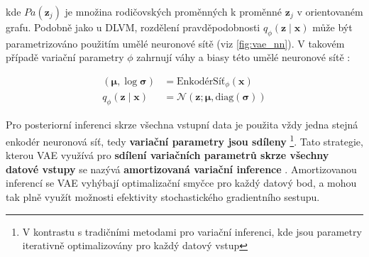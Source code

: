 kde $Pa(\textbf{z}_j)$ je množina rodičovských proměnných k proměnné $\textbf{z}_j$ v orientovaném grafu.
Podobně jako u DLVM, rozdělení pravděpodobnosti $q_\phi(\textbf{z}\mid\textbf{x})$ může být parametrizováno použitím umělé neuronové sítě (viz \autoref{fig:vae_nn}).
V takovém případě variační parametry $\phi$ zahrnují váhy a biasy této umělé neuronové sítě \cite{Kingma2014}:


\begin{align}
    (\boldsymbol{\mu}, \log \boldsymbol{\sigma}) &= \text{EnkodérSíť}_\phi(\textbf{x}) \\
    q_\phi(\textbf{z}\mid\textbf{x}) &= \mathcal{N}(\textbf{z}; \boldsymbol{\mu}, \text{diag}(\boldsymbol{\sigma})) \label{eq:enkoder_diag}
\end{align}

Pro posteriorní inferenci skrze všechna vstupní data je použita vždy jedna stejná enkodér neuronová síť, tedy \textbf{variační parametry jsou sdíleny}
\footnote{V kontrastu s tradičními metodami pro variační inferenci, kde jsou parametry iterativně optimalizovány pro každý datový vstup}.
Tato strategie, kterou VAE využívá pro \textbf{sdílení variačních parametrů skrze všechny datové vstupy} se nazývá \textbf{amortizovaná variační inference} \cite{Gershman2014}.
Amortizovanou inferencí se VAE vyhýbají optimalizační smyčce pro každý datový bod, a mohou tak plně využít možnosti efektivity stochastického gradientního sestupu. \cite{Kingma2019}